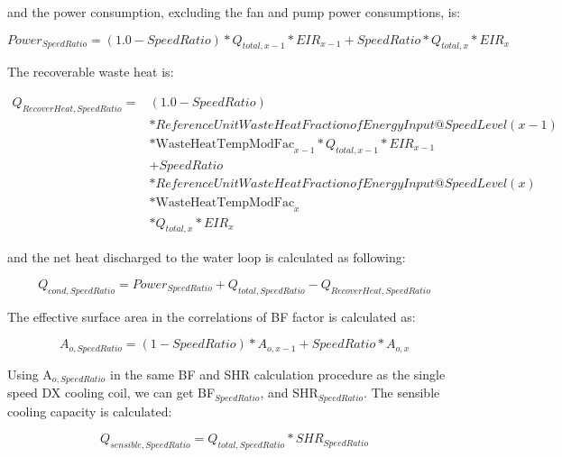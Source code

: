 and the power consumption, excluding the fan and pump power consumptions, is:

\begin{equation}
Powe{r_{SpeedRatio}} = \left( {1.0 - SpeedRatio} \right)*{Q_{total,x - 1}}*EI{R_{x - 1}} + SpeedRatio*{Q_{total,x}}*EI{R_x}
\end{equation}

The recoverable waste heat is:

\begin{equation}
  \begin{array}{rl}
    Q_{RecoverHeat,SpeedRatio} =& \left( {1.0 - SpeedRatio} \right) \\
                               &* ReferenceUnitWasteHeatFractionofEnergyInput@SpeedLevel\left( {x - 1} \right) \\
                               &* \mathrm{WasteHeatTempModFac}_{x - 1} * {Q_{total,x - 1}} * EIR_{x - 1} \\
                               &+ SpeedRatio \\
                               &* ReferenceUnitWasteHeatFractionofEnergyInput@SpeedLevel\left( x \right) \\
                               &* \mathrm{WasteHeatTempModFac}_x \\
                               &* Q_{total,x} * EIR_x
  \end{array}
\end{equation}

and the net heat discharged to the water loop is calculated as following:

\begin{equation}
{Q_{cond,SpeedRatio}} = Powe{r_{SpeedRatio}} + {Q_{total,SpeedRatio}} - {Q_{RecoverHeat,SpeedRatio}}
\end{equation}

The effective surface area in the correlations of BF factor is calculated as:

\begin{equation}
{A_{o,SpeedRatio}} = \left( {1 - SpeedRatio} \right)*{A_{o,x - 1}} + SpeedRatio*{A_{o,x}}
\end{equation}

Using A\(_{o,SpeedRatio}\) in the same BF and SHR calculation procedure as the single speed DX cooling coil, we can get BF\(_{SpeedRatio}\), and SHR\(_{SpeedRatio}\).  The sensible cooling capacity is calculated:

\begin{equation}
{Q_{sensible,SpeedRatio}} = {Q_{total,SpeedRatio}}*SH{R_{SpeedRatio}}
\end{equation}

